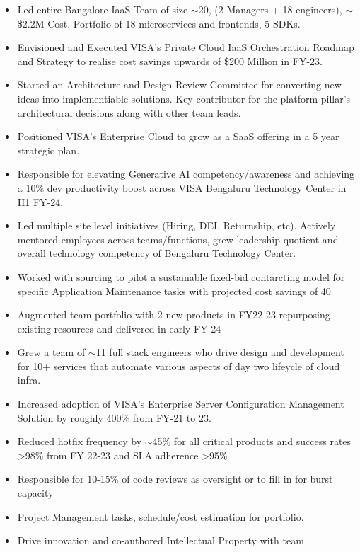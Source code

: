 \documentclass[10pt,a4paper,ragged2e,withhyper]{altacv}
\begin{document}
\begin{paracol}{2}


\begin{itemize}
  \item Led entire Bangalore IaaS Team of size \(\sim \)20, (2 Managers + 18 engineers), \(\sim\)\$2.2M Cost, Portfolio of 18 microservices and frontends, 5 SDKs.
  \item Envisioned and Executed VISA's Private Cloud IaaS Orchestration Roadmap and Strategy to realise cost savings upwards of \$200 Million in FY-23.
  \item Started an Architecture and Design Review Committee for converting new ideas into implementiable solutions. Key contributor for the platform pillar's architectural decisions along with other team leads.
  \item Positioned VISA's Enterprise Cloud to grow as a SaaS offering in a 5 year strategic plan.
  \item Responsible for elevating Generative AI competency/awareness and achieving a 10\% dev productivity boost across VISA Bengaluru Technology Center in H1 FY-24.
  \item Led multiple site level initiatives (Hiring, DEI, Returnship, etc). Actively mentored employees across teams/functions, grew leadership quotient and overall technology competency of Bengaluru Technology Center.
  \item Worked with sourcing to pilot a sustainable fixed-bid contarcting model for specific Application Maintenance tasks with projected cost savings of 40%
\end{itemize}

\divider

\begin{itemize}
  \item Augmented team portfolio with 2 new products in FY22-23 repurposing existing resources and delivered in early FY-24
  \item Grew a team of \(\sim \)11 full stack engineers who drive design and development for 10+ services that automate various aspects of day two lifeycle of cloud infra.
  \item Increased adoption of VISA's Enterprise Server Configuration Management Solution by roughly 400\% from FY-21 to 23.
  \item Reduced hotfix frequency by \(\sim \)45\% for all critical products and success rates >98\% from FY 22-23 and SLA adherence >95\%
  \item Responsible for 10-15\% of code reviews as oversight or to fill in for burst capacity 
  \item Project Management tasks, schedule/cost estimation for portfolio.
  \item Drive innovation and co-authored Intellectual Property with team
\end{itemize}


\end{paracol}
\end{document}
